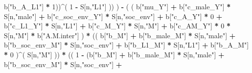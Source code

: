 \documentclass[
]{book}
\newenvironment{Shaded}{\begin{snugshade}}{\end{snugshade}}
\newcommand{\DecValTok}[1]{\textcolor[rgb]{0.00,0.00,0.81}{#1}}
\newcommand{\NormalTok}[1]{#1}
\newcommand{\SpecialCharTok}[1]{\textcolor[rgb]{0.81,0.36,0.00}{\textbf{#1}}}
\newcommand{\StringTok}[1]{\textcolor[rgb]{0.31,0.60,0.02}{#1}}
\begin{document}
\begin{Shaded}
\begin{Highlighting}[]
\NormalTok{                                   b[}\StringTok{"b\_A\_L1"}\NormalTok{] }\SpecialCharTok{*} \DecValTok{1}\NormalTok{))}\SpecialCharTok{\^{}}\NormalTok{( }\DecValTok{1} \SpecialCharTok{{-}}\NormalTok{ S[n,}\StringTok{"L1"}\NormalTok{] )) ) }\SpecialCharTok{{-}} 
\NormalTok{                      ( ( b[}\StringTok{"mu\_Y"}\NormalTok{] }\SpecialCharTok{+} 
\NormalTok{                            b[}\StringTok{"c\_male\_Y"}\NormalTok{] }\SpecialCharTok{*}\NormalTok{ S[n,}\StringTok{"male"}\NormalTok{] }\SpecialCharTok{+} 
\NormalTok{                            b[}\StringTok{"c\_soc\_env\_Y"}\NormalTok{] }\SpecialCharTok{*}\NormalTok{ S[n,}\StringTok{"soc\_env"}\NormalTok{] }\SpecialCharTok{+}
\NormalTok{                            b[}\StringTok{"c\_A\_Y"}\NormalTok{] }\SpecialCharTok{*} \DecValTok{0} \SpecialCharTok{+}
\NormalTok{                            b[}\StringTok{"c\_L1\_Y"}\NormalTok{] }\SpecialCharTok{*}\NormalTok{ S[n,}\StringTok{"L1"}\NormalTok{] }\SpecialCharTok{+}
\NormalTok{                            b[}\StringTok{"c\_M\_Y"}\NormalTok{] }\SpecialCharTok{*}\NormalTok{ S[n,}\StringTok{"M"}\NormalTok{] }\SpecialCharTok{+} 
\NormalTok{                            b[}\StringTok{"c\_AM\_Y"}\NormalTok{] }\SpecialCharTok{*} \DecValTok{0} \SpecialCharTok{*}\NormalTok{ S[n,}\StringTok{"M"}\NormalTok{] }\SpecialCharTok{*}\NormalTok{ b[}\StringTok{"A.M.inter"}\NormalTok{] ) }\SpecialCharTok{*}
\NormalTok{                          (( b[}\StringTok{"b\_M"}\NormalTok{] }\SpecialCharTok{+} 
\NormalTok{                               b[}\StringTok{"b\_male\_M"}\NormalTok{] }\SpecialCharTok{*}\NormalTok{ S[n,}\StringTok{"male"}\NormalTok{] }\SpecialCharTok{+} 
\NormalTok{                               b[}\StringTok{"b\_soc\_env\_M"}\NormalTok{] }\SpecialCharTok{*}\NormalTok{ S[n,}\StringTok{"soc\_env"}\NormalTok{] }\SpecialCharTok{+} 
\NormalTok{                               b[}\StringTok{"b\_L1\_M"}\NormalTok{] }\SpecialCharTok{*}\NormalTok{ S[n,}\StringTok{"L1"}\NormalTok{] }\SpecialCharTok{+}
\NormalTok{                               b[}\StringTok{"b\_A\_M"}\NormalTok{] }\SpecialCharTok{*} \DecValTok{0}\NormalTok{ )}\SpecialCharTok{\^{}}\NormalTok{( S[n,}\StringTok{"M"}\NormalTok{] )) }\SpecialCharTok{*}
\NormalTok{                          (( }\DecValTok{1} \SpecialCharTok{{-}}\NormalTok{ (b[}\StringTok{"b\_M"}\NormalTok{] }\SpecialCharTok{+} 
\NormalTok{                                    b[}\StringTok{"b\_male\_M"}\NormalTok{] }\SpecialCharTok{*}\NormalTok{ S[n,}\StringTok{"male"}\NormalTok{] }\SpecialCharTok{+} 
\NormalTok{                                    b[}\StringTok{"b\_soc\_env\_M"}\NormalTok{] }\SpecialCharTok{*}\NormalTok{ S[n,}\StringTok{"soc\_env"}\NormalTok{] }\SpecialCharTok{+} 

\end{Highlighting}
\end{Shaded}
\end{document}

